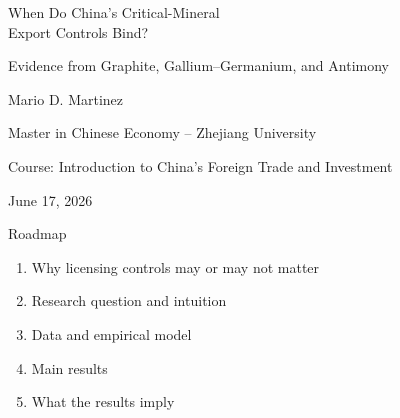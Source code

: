 \documentclass[aspectratio=169,11pt]{beamer}
\begin{document}
\begin{frame}[plain]
  \vspace{0.55cm}
  {
  When Do China's Critical-Mineral\\Export Controls Bind?\par}
  \vspace{0.35cm}
  {\large Evidence from Graphite, Gallium--Germanium, and Antimony\par}
  \vfill
  {\large Mario D. Martinez\par}
  \vspace{0.12cm}
  {Master in Chinese Economy -- Zhejiang University\par}
  {Course: Introduction to China's Foreign Trade and Investment\par}
  \vspace{0.25cm}
  {June 17, 2026\par}
\end{frame}

\begin{frame}{Roadmap}
  \large
  \begin{enumerate}
    \item Why licensing controls may or may not matter
    \item Research question and intuition
    \item Data and empirical model
    \item Main results
    \item What the results imply
  \end{enumerate}
\end{frame}
\end{document}
